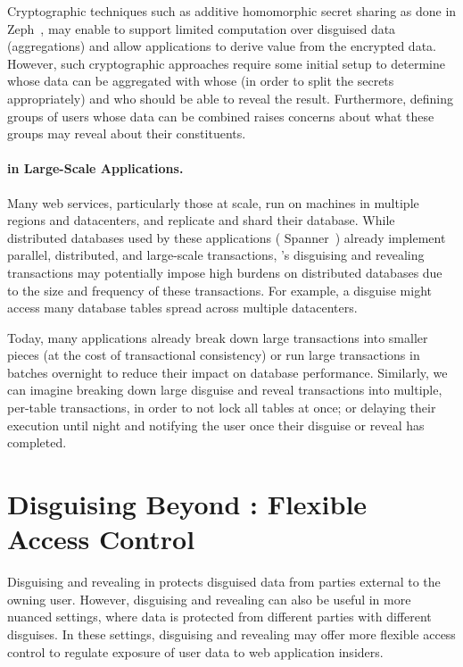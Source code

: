 
%
Cryptographic techniques such as additive homomorphic secret sharing as done in
Zeph~\cite{zeph}, may enable \sys to support limited computation over disguised
data (\eg aggregations) and allow applications to derive value from the
encrypted data.
%
However, such cryptographic approaches require some initial setup to determine
whose data can be aggregated with whose (in order to split the secrets
appropriately) and who should be able to reveal the result. Furthermore, defining
groups of users whose data can be combined raises concerns about what these
groups may reveal about their constituents.
%

\paragraph{\sys in Large-Scale Applications.}
Many web services, particularly those at scale, run on machines in multiple 
regions and datacenters, and replicate and shard their database.
%
While distributed databases used by these applications (\eg
Spanner~\cite{spanner}) already implement parallel, distributed, and large-scale
transactions, \sys's disguising and revealing transactions may potentially
impose high burdens on distributed databases due to the size and frequency of
these transactions.
%
For example, a disguise might access many database tables spread across multiple
datacenters.
%

%
Today, many applications already break down large transactions into smaller
pieces (at the cost of transactional consistency) or run large transactions in
batches overnight to reduce their impact on database performance.
%
Similarly, we can imagine \sys breaking down large disguise and reveal transactions
into multiple, per-table transactions, in order to not lock all tables at once; or
delaying their execution until night and notifying the user once their
disguise or reveal has completed. 
%

\section{Disguising Beyond \sys: Flexible Access Control}
Disguising and revealing in \sys protects disguised data from parties external
to the owning user. However, disguising and revealing can also be useful in more
nuanced settings, where data is protected from different parties with different
disguises.
%
In these settings, disguising and revealing may offer more flexible access
control to regulate exposure of user data to web application insiders.
%

